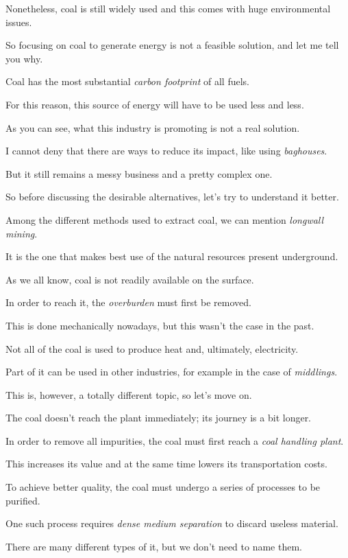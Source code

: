 Nonetheless, coal is still widely used and this comes with huge environmental issues.

\ex So focusing on coal to generate energy is not a feasible solution, and let me tell you why.

Coal has the most substantial \textit{carbon footprint} of all fuels.

For this reason, this source of energy will have to be used less and less.

\ex As you can see, what this industry is promoting is not a real solution.

I cannot deny that there are ways to reduce its impact, like using \textit{baghouses}.

But it still remains a messy business and a pretty complex one.

\ex So before discussing the desirable alternatives, let's try to understand it better.

Among the different methods used to extract coal, we can mention \textit{longwall mining}.

It is the one that makes best use of the natural resources present underground.

\ex As we all know, coal is not readily available on the surface.

In order to reach it, the \textit{overburden} must first be removed.

This is done mechanically nowadays, but this wasn't the case in the past.

\ex Not all of the coal is used to produce heat and, ultimately, electricity.

Part of it can be used in other industries, for example in the case of \textit{middlings}.

This is, however, a totally different topic, so let's move on.

\ex The coal doesn't reach the plant immediately; its journey is a bit longer.

In order to remove all impurities, the coal must first reach a \textit{coal handling plant}.

This increases its value and at the same time lowers its transportation costs.

\ex To achieve better quality, the coal must undergo a series of processes to be purified.

One such process requires \textit{dense medium separation} to discard useless material.

There are many different types of it, but we don't need to name them.

